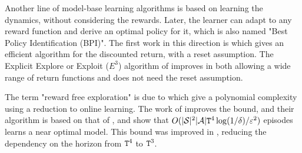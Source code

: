 Another line of model-base learning algorithms is based on learning the dynamics, without considering the rewards. Later, the learner can adapt to any reward function and derive an optimal policy for it, which is also named "Best Policy Identification (BPI)".
The first work in this direction is \cite{Fiechter94} which gives an efficient algorithm for the discounted return, with a reset assumption.
The Explicit Explore or Exploit ($E^3$) algorithm of \cite{KearnsS02} improves in both allowing a wide range of return functions and does not need the reset assumption. 

The term "reward free exploration" is due to \cite{JinKSY20} which give a polynomial complexity using a reduction to online learning.
The work of \cite{KaufmannMDJLV21} improves the bound, and their algorithm is based on that of  \cite{Fiechter94}, and show that $O(|\mathcal{S}|^2|\mathcal{A}|{\tt T}^4\log(1/\delta)/\varepsilon^2)$ episodes learns a near optimal model.
This bound was improved in \cite{MenardDJKLV21}, reducing the dependency on the horizon from ${\tt T}^4$ to ${\tt T}^3$.






